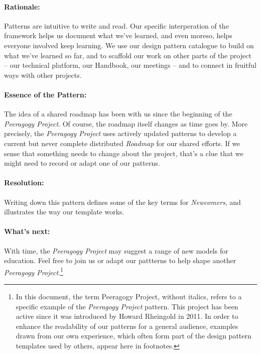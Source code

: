 \paragraph{Rationale:}
Patterns are intuitive to write and read.  Our specific interperation of the framework helps us document what we've learned, and even moreso, helps everyone involved keep learning.  We use our design pattern catalogue to build on what we've learned so far, and to scaffold our work on other parts of the project -- our technical platform, our Handbook, our meetings -- and to connect in fruitful ways with other projects.  

\paragraph{Essence of the Pattern:}
The idea of a shared roadmap has been with us since the beginning of the \emph{Peeragogy Project}.  Of course, the roadmap itself changes as time goes by.  More precisely, the \emph{Peeragogy Project} uses actively updated patterns to develop a current but never complete distributed \emph{Roadmap} for our shared efforts.  If we sense that something needs to  change about the project, that’s a clue that we might need to record or adapt one of our patterns. 

\paragraph{Resolution:}  
Writing down this pattern defines some of the key terms for \emph{Newcomers}, and illustrates the way our template works. 

\paragraph{What's next:} 
With time, the \emph{Peeragogy Project} may suggest a range of new models for education.  Feel free to join us or adapt our pattterns to help shape another \emph{Peeragogy Project}.\footnote{In this document, the term Peeragogy Project, without italics, refers to a specific example of the \emph{Peeragogy Project} pattern.   This project has been active since it was introduced by Howard Rheingold in 2011.  In order to enhance the readability of our patterns for a general audience, examples drawn from our own experience, which often form part of the design pattern templates used by others, appear here in footnotes.}